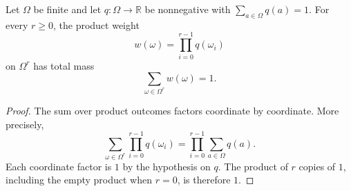 \begin{helper}
Let \(\Omega\) be finite and let \(q:\Omega\to\mathbb R\) be nonnegative with
\(\sum_{a\in\Omega}q(a)=1\).  For every \(r\ge 0\), the product weight
\[
w(\omega)=\prod_{i=0}^{r-1}q(\omega_i)
\]
on \(\Omega^r\) has total mass
\[
\sum_{\omega\in\Omega^r} w(\omega)=1.
\]
\end{helper}
\begin{proof}
The sum over product outcomes factors coordinate by coordinate.  More
precisely,
\[
\sum_{\omega\in\Omega^r}\prod_{i=0}^{r-1}q(\omega_i)
=\prod_{i=0}^{r-1}\sum_{a\in\Omega}q(a).
\]
Each coordinate factor is \(1\) by the hypothesis on \(q\).  The product of
\(r\) copies of \(1\), including the empty product when \(r=0\), is therefore
\(1\).
\end{proof}

